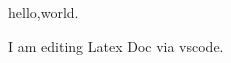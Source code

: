 \documentclass{article}
\begin{document}
hello,world.

I am editing Latex Doc via vscode.
\end{document}
